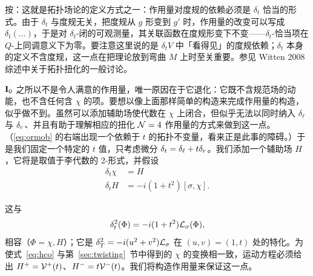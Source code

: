 \begin{yizhu}[物理图像]
按：这就是拓扑场论的定义方式之一：作用量对度规的依赖必须是 $\delta_t$ 恰当的形式。由于 $\delta_t$ 与度规无关，把度规从 $g$ 形变到 $g'$ 时，作用量的改变可以写成 $\delta_t(\dots)$，于是对 $\delta_t$-闭的可观测量，其关联函数在度规形变下不变——$\delta_t$-恰当项在 $Q$-上同调意义下为零。要注意这里说的是 $\delta_tV$ 中「看得见」的度规依赖；$\delta_t$ 本身的定义不含度规，这一点在把理论放到弯曲 $M$ 上时至关重要。参见 Witten 2008 综述中关于拓扑扭化的一般讨论。
\end{yizhu}

${{{\mathbf{I}}}}_0$ 之所以不是令人满意的作用量，唯一原因在于它退化：它既不含规范场的动能，也不含任何含 $\chi$ 的项。要想以像上面那样简单的构造来完成作用量的构造，似乎做不到。虽然可以添加辅助场使代数在 $\chi$ 上闭合，但似乎无法以同时纳入 $\delta_\ell$ 与 $\delta_r$、并且有助于理解相应的扭化 ${{\mathcal{N}}}=4$ 作用量的方式来做到这一点。（\eqref{eq:ormob} 的右端出现一个依赖于 $t$ 的拓扑不变量，看来正是此事的障碍。）于是我们固定一个特定的 $t$ 值，只考虑微分 $\delta_t=\delta_\ell+t\delta_r$。我们添加一个辅助场 $H$，它将是取值于李代数的 2-形式，并假设%
\setcounter{equation}{40}
\begin{equation}\label{eq:hco}
\begin{aligned}\delta_t\chi& = H\\
                           \delta_t H & =
                           -i(1+t^2)[\sigma,\chi].\end{aligned}
\end{equation}

这与
\setcounter{equation}{41}
\begin{equation}\label{eq:kino}
\delta_t^2(\Phi)=-i(1+t^2){{{\mathcal{L}}}}_\sigma(\Phi),
\end{equation}
相容（$\Phi=\chi,H$）；它是 $\delta_T^2=-i(u^2+v^2){\mathcal{L}}_\sigma$ 在 $(u,v)=(1,t)$ 处的特化。为使式~\eqref{eq:hco} 与第~\ref{sec:twisting}~节中得到的 $\chi$ 的变换相一致，运动方程必须给出 $H^+={\mathcal{V}}^+(t)$、$H^-=t{\mathcal{V}}^-(t)$。我们将构造作用量来保证这一点。

